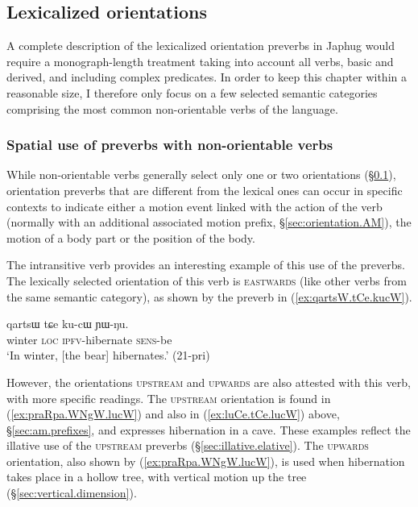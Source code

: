 \subsection{Lexicalized orientations} \label{sec:lexicalized.orientation}
A complete description of the lexicalized orientation preverbs in Japhug would require a monograph-length treatment taking into account all verbs, basic and derived, and including complex predicates. In order to keep this chapter within a reasonable size, I therefore only focus on a few selected semantic categories comprising the most common non-orientable verbs of the language.

\subsubsection{Spatial use of preverbs with non-orientable verbs} \label{sec:orientation.position}
While non-orientable verbs generally select only one or two orientations (§\ref{sec:lexicalized.orientation}), orientation preverbs that are different from the lexical ones can occur in specific contexts to indicate either a motion event linked with the action of the verb (normally with an additional associated motion prefix, §\ref{sec:orientation.AM}), the motion of a body part or the position of the body. 

The intransitive verb  provides an interesting example of this use of the preverbs. The lexically selected orientation of this verb is \textsc{eastwards} (like other verbs from the same semantic category), as shown by the preverb  in (\ref{ex:qartsW.tCe.kucW}).

\begin{exe}
\ex \label{ex:qartsW.tCe.kucW}
\gll  qartsɯ tɕe ku-cɯ ɲɯ-ŋu. \\
winter \textsc{loc} \textsc{ipfv}-hibernate \textsc{sens}-be \\
\glt `In winter, [the bear] hibernates.' (21-pri) 
\end{exe}

However, the orientations \textsc{upstream} and \textsc{upwards} are also attested with this verb, with more specific readings. The \textsc{upstream} orientation is found in (\ref{ex:praRpa.WNgW.lucW}) and also in (\ref{ex:luCe.tCe.lucW}) above, §\ref{sec:am.prefixes}, and expresses hibernation in a cave. These examples reflect the illative use of the \textsc{upstream} preverbs (§\ref{sec:illative.elative}). The \textsc{upwards} orientation, also shown by (\ref{ex:praRpa.WNgW.lucW}), is used when hibernation takes place in a hollow tree, with vertical motion up the tree (§\ref{sec:vertical.dimension}).

